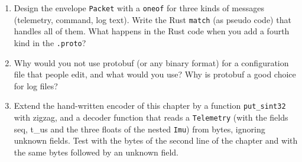 \begin{enumerate}[label=\textbf{\thechapter.\arabic*}]
  \item Design the envelope \verb!Packet! with a \verb!oneof! for three kinds of messages (telemetry, command, log text). Write the Rust \verb!match! (as pseudo code) that handles all of them. What happens in the Rust code when you add a fourth kind in the \verb!.proto!?
  \item Why would you not use protobuf (or any binary format) for a configuration file that people edit, and what would you use? Why is protobuf a good choice for log files?
  \item[\textbf{\thechapter.10}$\star$] Extend the hand-written encoder of this chapter by a function \verb!put_sint32! with zigzag, and a decoder function that reads a \verb!Telemetry! (with the fields seq, t\_us and the three floats of the nested \verb!Imu!) from bytes, ignoring unknown fields. Test with the bytes of the second line of the chapter and with the same bytes followed by an unknown field.
\end{enumerate}
